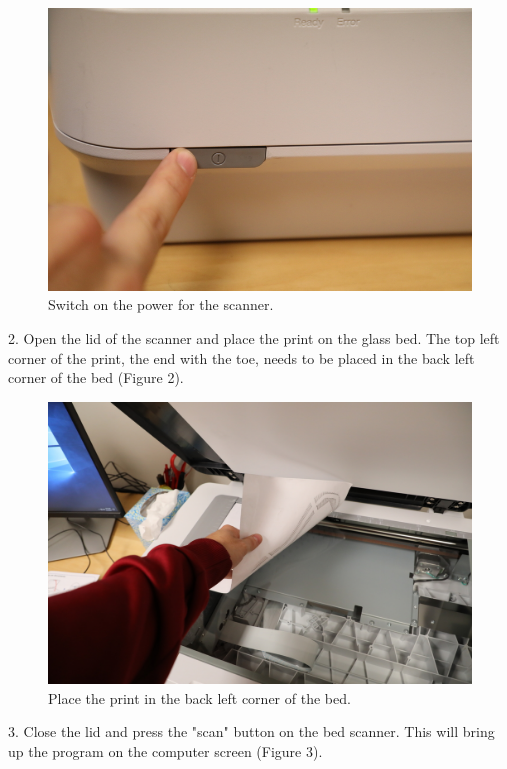 \begin{figure}[!htp]
\centering
\includegraphics[scale=0.4]{Bed_On}
\caption{Switch on the power for the scanner.}
\label{Image 1}
\end{figure}

2. Open the lid of the scanner and place the print on the glass bed. The top left corner of the print, the end with the toe, needs to be placed in the back left corner of the bed (Figure 2). 

\begin{figure}[!htp]
\centering
\includegraphics[scale=0.25]{Bed_Paper}
\caption{Place the print in the back left corner of the bed.}
\label{Image 2}
\end{figure}

\newpage

3. Close the lid and press the "scan" button on the bed scanner. This will bring up the program on the computer screen (Figure 3). 

